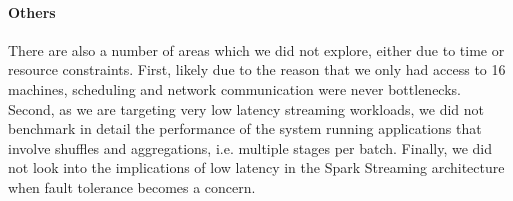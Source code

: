 
\paragraph{Others} There are also a number of areas which we did not explore, either due to time or resource constraints. First, likely due to the reason that we only had access to 16 machines, scheduling and network communication were never bottlenecks. Second, as we are targeting very low latency streaming workloads, we did not benchmark in detail the performance of the system running applications that involve shuffles and aggregations, i.e. multiple stages per batch. Finally, we did not look into the implications of low latency in the Spark Streaming architecture when fault tolerance becomes a concern.
